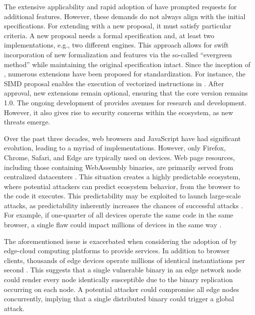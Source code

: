 The extensive applicability and rapid adoption of \Wasm have prompted requests for additional features. 
However, these demands do not always align with the initial specifications. 
For extending \Wasm with a new proposal, it must satisfy particular criteria.
A new proposal needs a formal specification and, at least two implementations, e.g., two different \Wasm engines. 
This approach allows for swift incorporation of new formalization and features via the so-called ``evergreen method'' while maintaining the original \Wasm specification intact. 
Since the inception of \Wasm, numerous extensions have been proposed for standardization. 
For instance, the SIMD proposal enables the execution of vectorized instructions in \Wasm. 
After approval, new extensions remain optional, ensuring that the core \Wasm version remains 1.0. 
The ongoing development of \Wasm provides avenues for research and development. 
However, it also gives rise to security concerns within the ecosystem, as new threats emerge.


Over the past three decades, web browsers and JavaScript have had significant evolution, leading to a myriad of implementations. 
However, only Firefox, Chrome, Safari, and Edge are typically used on devices. 
Web page resources, including those containing WebAssembly binaries, are primarily served from centralized datacenters \cite{STRAC}. 
This situation creates a highly predictable ecosystem, where potential attackers can predict ecosystem behavior, from the browser to the code it executes. 
This predictability may be exploited to launch large-scale attacks, as predictability inherently increases the chances of successful attacks \cite{MTDNationalCyberLaep}. 
For example, if one-quarter of all devices operate the same code in the same browser, a single flaw could impact millions of devices in the same way \cite{goth2003addressing}. 

The aforementioned issue is exacerbated when considering the adoption of \Wasm by edge-cloud computing platforms to provide services. 
In addition to browser clients, thousands of edge devices operate millions of identical \Wasm instantiations per second \cite{10034550}. 
This suggests that a single vulnerable \Wasm binary in an edge network node could render every node identically susceptible due to the binary replication occurring on each node.
A potential attacker could compromise all edge nodes concurrently, implying that a single distributed \Wasm binary could trigger a global attack.
 




